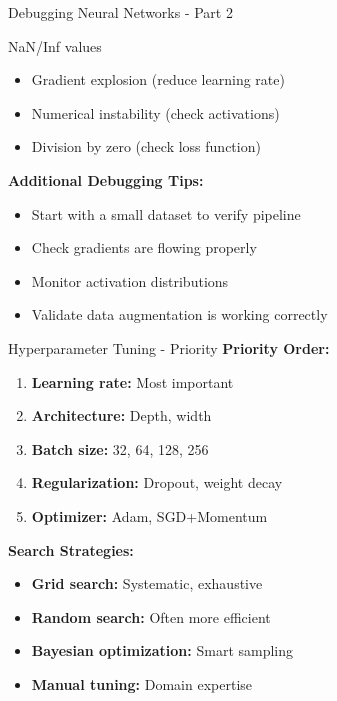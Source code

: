 \documentclass[aspectratio=169,10pt]{beamer}
\begin{document}
\begin{frame}{Debugging Neural Networks - Part 2}
\begin{alertblock}{NaN/Inf values}
\begin{itemize}
\item Gradient explosion (reduce learning rate)
\item Numerical instability (check activations)
\item Division by zero (check loss function)
\end{itemize}
\end{alertblock}

\textbf{Additional Debugging Tips:}
\begin{itemize}
\item Start with a small dataset to verify pipeline
\item Check gradients are flowing properly
\item Monitor activation distributions
\item Validate data augmentation is working correctly
\end{itemize}
\end{frame}

\begin{frame}{Hyperparameter Tuning - Priority}
\textbf{Priority Order:}
\begin{enumerate}
\item \textbf{Learning rate:} Most important
\item \textbf{Architecture:} Depth, width
\item \textbf{Batch size:} 32, 64, 128, 256
\item \textbf{Regularization:} Dropout, weight decay
\item \textbf{Optimizer:} Adam, SGD+Momentum
\end{enumerate}

\textbf{Search Strategies:}
\begin{itemize}
\item \textbf{Grid search:} Systematic, exhaustive
\item \textbf{Random search:} Often more efficient
\item \textbf{Bayesian optimization:} Smart sampling
\item \textbf{Manual tuning:} Domain expertise
\end{itemize}
\end{frame}
\end{document}
